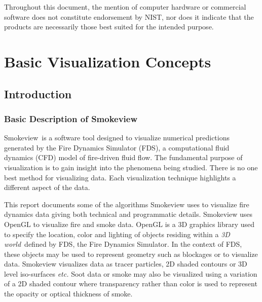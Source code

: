 \documentclass[11pt,twoside]{book}
\newcommand{\fds}{{FDS}}
\newcommand{\Smokeview}{{Smokeview}}
\begin{document}
Throughout this document, the mention of computer hardware or
commercial software does not constitute endorsement by NIST,
nor does
it indicate that the products are necessarily those
best suited for the
intended purpose.




\tableofcontents
\listoffigures

\mainmatter


\part{Basic Visualization Concepts}
\chapter{Introduction}
\section{Basic Description of Smokeview}
\Smokeview\ is a software tool designed to visualize numerical
predictions generated by the Fire Dynamics Simulator (\fds),
a computational fluid dynamics (CFD) model of fire-driven fluid
flow\cite{FDS_Tech_Guide_5}.  The fundamental purpose of visualization is to gain
insight into the phenomena being studied.  There is no one best method for visualizing data.
Each visualization technique highlights a different aspect of the data.

This report documents some of the algorithms Smokeview uses to visualize fire dynamics data giving both technical and programmatic details.
Smokeview uses OpenGL to visualize fire and smoke data.  OpenGL
is a 3D graphics library used to specify the location, color and
lighting of objects residing within a {\em 3D world}\ defined by FDS,
the Fire Dynamics Simulator. In the context of FDS, these objects
may be used to represent geometry such as blockages or to
visualize data. Smokeview visualizes data as tracer particles, 2D
shaded contours or 3D level iso-surfaces {\em etc.}  Soot data or
smoke may also be visualized using a variation of a 2D shaded
contour where transparency rather than color is used to represent
the opacity or optical thickness of smoke.
\end{document}
